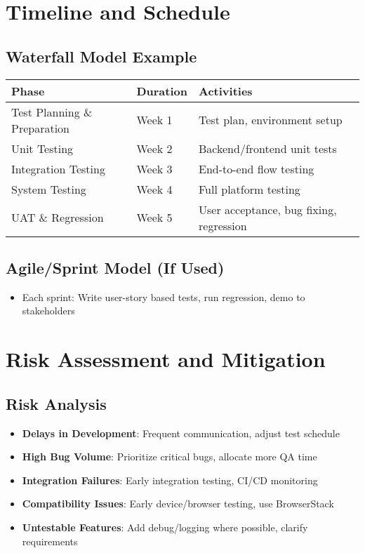 \documentclass[a4paper,11pt]{scrartcl}
\begin{document}
\section{Timeline and Schedule}

\subsection{Waterfall Model Example}
\begin{tabularx}{\textwidth}{l l X}
\toprule
Phase & Duration & Activities \\
\midrule
Test Planning \& Preparation & Week 1 & Test plan, environment setup \\
Unit Testing & Week 2 & Backend/frontend unit tests \\
Integration Testing & Week 3 & End-to-end flow testing \\
System Testing & Week 4 & Full platform testing \\
UAT \& Regression & Week 5 & User acceptance, bug fixing, regression \\
\bottomrule
\end{tabularx}

\subsection{Agile/Sprint Model (If Used)}
\begin{itemize}[leftmargin=*]
    \item Each sprint: Write user-story based tests, run regression, demo to stakeholders
\end{itemize}

\section{Risk Assessment and Mitigation}

\subsection{Risk Analysis}
\begin{itemize}[leftmargin=*]
    \item \textbf{Delays in Development}: Frequent communication, adjust test schedule
    \item \textbf{High Bug Volume}: Prioritize critical bugs, allocate more QA time
    \item \textbf{Integration Failures}: Early integration testing, CI/CD monitoring
    \item \textbf{Compatibility Issues}: Early device/browser testing, use BrowserStack
    \item \textbf{Untestable Features}: Add debug/logging where possible, clarify requirements
\end{itemize}
\end{document}
